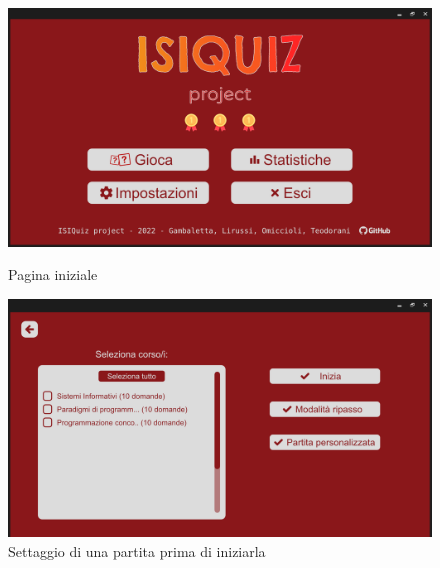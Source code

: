         \begin{figure}[H]
          \centering
          \begin{minipage}[b]{0.48\textwidth}
            \includegraphics[width=\textwidth]{Images/mockup/home3.png}
            \caption{Pagina iniziale}
            \label{fig:home3}
          \end{minipage}
          \hfill
          \begin{minipage}[b]{0.48\textwidth}
            \includegraphics[width=\textwidth]{Images/mockup/start3.png}
            \caption{Settaggio di una partita prima di iniziarla}
            \label{fig:start3}
          \end{minipage}
        \end{figure}

